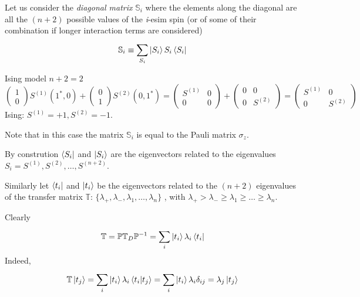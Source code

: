 \documentclass[../main/main.tex]{subfiles}
\begin{document}
Let us consider  the \emph{diagonal matrix} \( \mathbb{S}_i \) where the elements along the diagonal are all the  \( (n+2) \) possible values of the \emph{i}-esim spin (or of some of their combination if longer interaction terms are considered)
\begin{equation}
  \mathbb{S}_i \equiv  \sum_{S_i}^{} \ket{S_i} S_i \bra{S_i}
\end{equation}
\begin{example}
Ising model \( n+2=2 \)
\begin{equation*}
  \begin{pmatrix}
  1 \\
  0
  \end{pmatrix} S^{(1)} (1^*,0) +
  \begin{pmatrix}
  0 \\
  1
  \end{pmatrix} S^{(2)} (0,1^*) =
  \begin{pmatrix}
  S^{(1)}   & 0 \\
  0   & 0
  \end{pmatrix}
  +
  \begin{pmatrix}
  0   & 0 \\
  0   & S^{(2)}
  \end{pmatrix}
  =
  \begin{pmatrix}
  S^{(1)}  & 0 \\
  0   & S^{(2)}
  \end{pmatrix}
\end{equation*}
Ising: \( S^{(1)} =+1,S^{(2)}=-1 \).
\begin{remark}
Note that in this case the matrix \( \mathbb{S}_i \) is equal to the Pauli matrix \( \sigma _z \).
\end{remark}
\end{example}
\begin{remark}
By constrution \( \bra{S_i}  \) and \( \ket{S_i}  \) are the eigenvectors related to the eigenvalues \( S_i = S^{(1)},S^{(2)}, \dots,S^{(n+2)} \).
\end{remark}
Similarly let \( \bra{t_i}  \) and \( \ket{t_i}  \) be the eigenvectors related to the \( (n+2) \) eigenvalues of the transfer matrix \( \mathbb{T} \):
   \( \{ \lambda _+,\lambda _-,\lambda _1,\dots,\lambda _n  \}   \) , with \( \lambda _+ > \lambda _- \ge \lambda _1 \ge \dots \ge \lambda _n \).

Clearly
\begin{equation}
  \mathbb{T} = \mathbb{P} \mathbb{T}_D \mathbb{P}^{-1} = \sum_{i}^{} \ket{t_i} \lambda _i \bra{t_i}
\end{equation}
Indeed,
\begin{equation}
  \mathbb{T} \ket{t_j} = \sum_{i}^{} \ket{t_i} \lambda _i \braket{t_i}{t_j} = \sum_{i}^{}  \ket{t_i} \lambda _i \delta _{ij} = \lambda _j \ket{t_j}
\end{equation}
\end{document}
